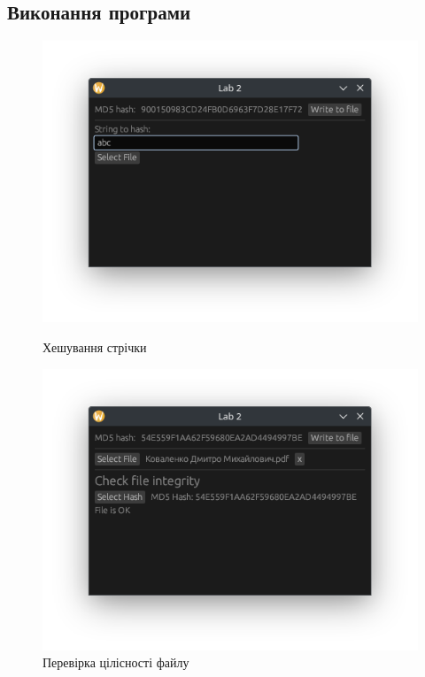 \documentclass[oneside,14pt]{extarticle}
\begin{document}
\begin{normalsize}
	\subsection*{Виконання програми}
	\begin{figure}[H]
		\centering
		\begin{minipage}{0.45\textwidth}
			\centering
			\includegraphics[scale=0.6]{1}
			\caption{Хешування стрічки}
		\end{minipage}
		\hfill
		\begin{minipage}{0.45\textwidth}
			\centering
			\includegraphics[scale=0.6]{2}
			\caption{Перевірка цілісності файлу}
		\end{minipage}
	\end{figure}
	

\end{normalsize}
\end{document}

